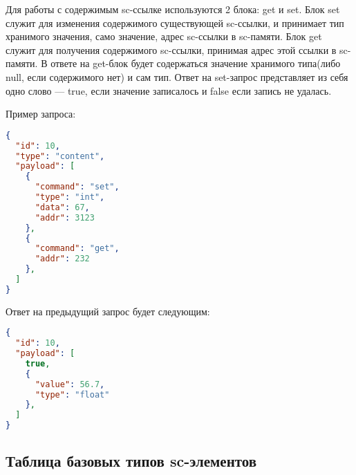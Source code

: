 Для работы с содержимым sc-ссылке используются 2 блока: get и set. Блок set служит для изменения содержимого существующей sc-ссылки, и принимает тип хранимого значения, само значение, адрес sc-ссылки в sc-памяти. Блок get служит для получения содержимого sc-ссылки, принимая адрес этой ссылки в sc-памяти. В ответе на get-блок будет содержаться значение хранимого типа(либо null, если содержимого нет) и сам тип. Ответ на set-запрос представляет из себя одно слово --- true, если значение записалось и false если запись не удалась.  

Пример запроса:
\begin{lstlisting}[language=json,firstnumber=1]
{
  "id": 10,
  "type": "content",
  "payload": [
    {
      "command": "set",
      "type": "int",  
      "data": 67,     
      "addr": 3123   
    },
    {
      "command": "get",
      "addr": 232       
    },
  ]
}
\end{lstlisting}

Ответ на предыдущий запрос будет следующим: 
\begin{lstlisting}[language=json,firstnumber=1]
{
  "id": 10,
  "payload": [
    true,      
    {
      "value": 56.7,  
      "type": "float"
    },
  ]
}
\end{lstlisting}


\subsection{Таблица базовых типов sc-элементов}

